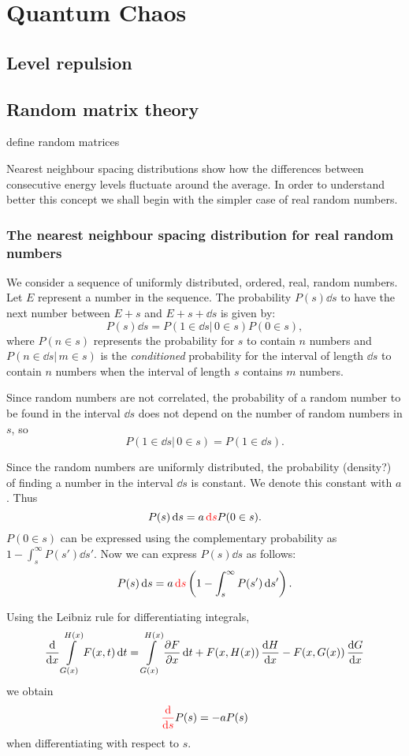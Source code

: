 \documentclass[../thesis.tex]{subfiles}
\begin{document}
\chapter{Quantum Chaos}

\section{Level repulsion}

\section{Random matrix theory}

{\color{red}define random matrices}

Nearest neighbour spacing distributions show how the differences
between consecutive energy levels fluctuate around the average.
In order to understand better this concept we shall begin with the simpler
case of real random numbers.

\subsection{The nearest neighbour spacing distribution for real random numbers}

We consider a sequence of uniformly distributed, ordered, real, random numbers.
Let $E$ represent a number in the sequence.
The probability \( P(s)\dd{s} \) to have the next number between \( E+s \) and
\( E+s+\dd{s} \) is given by:
\[
  P(s)\dd{s} = P(1 \in \dd{s} |\, 0 \in s) P(0 \in s),
\]
where \( P(n \in s) \) represents the probability for $s$ to contain $n$ numbers and
\( P(n \in \dd{s} |\, m \in s) \) is the \emph{conditioned} probability for
the interval of length \( \dd{s} \) to contain $n$ numbers when the interval of
length $s$ contains $m$ numbers.

Since random numbers are not correlated, the probability of a random number to be found
in the interval \( \dd{s} \) does not depend on the number of random numbers in $s$, so
\[
  P(1 \in \dd{s} |\, 0 \in s) = P(1 \in \dd{s}).
\]

Since the random numbers are uniformly distributed, the probability {\color{red} (density?)} of finding a number
in the interval \( \dd{s} \) is constant. We denote this constant with $a$. Thus
\[
  P(s)\dd{s} = a \,{\color{red}\dd{s}} P(0 \in s).
\]
\( P(0 \in s) \) can be expressed using the complementary probability as
\( {1 - \int_s^\infty P(s') \dd{s'}} \). Now we can express \( P(s)\dd{s} \) as follows:
\[
  P(s)\dd{s} = a \,{\color{red}\dd{s}} \left( 1 - \int_s^\infty P(s') \dd{s'} \right).
\]

Using the Leibniz rule for differentiating integrals,
\[
  \dv{x} \int\limits_{G(x)}^{H(x)} F(x, t) \dd{t} = \int\limits_{G(x)}^{H(x)} \pdv{F}{x} \dd{t}
  + F(x, H(x))\, \dv{H}{x} - F(x, G(x))\, \dv{G}{x}
\]
we obtain
\[
  {\color{red}\dv{s}}P(s) = -aP(s)
\]
when differentiating with respect to $s$.
\end{document}
